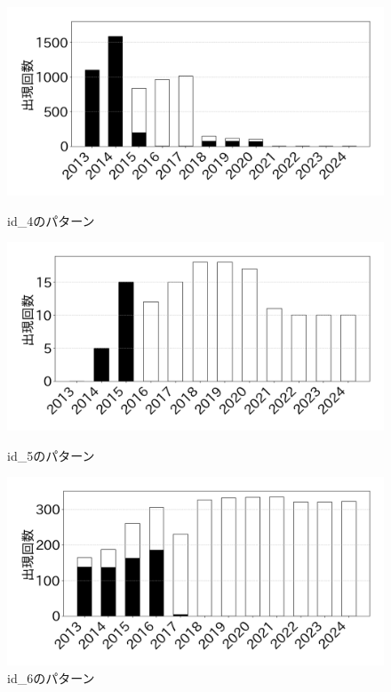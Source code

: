 \documentclass[submit,techrep,noauthor]{ipsj}
\begin{document}
\begin{figure}[h]
        \includegraphics[width=0.9\linewidth]{@BSthesis2024_Noguchi/Noguchi_fig/id_4.png}
        \vspace{-4mm}
        \caption{id\_4のパターン}
        \label{table:id_4}
        
        \includegraphics[width=0.9\linewidth]{@BSthesis2024_Noguchi/Noguchi_fig/id_5.png}
        \vspace{-4mm}
        \caption{id\_5のパターン}
        \label{table:id_5}
        
        \includegraphics[width=0.9\linewidth]{@BSthesis2024_Noguchi/Noguchi_fig/id_6.png}
        \vspace{-4mm}
        \caption{id\_6のパターン}
        \label{table:id_6}
\end{figure}
\end{document}
